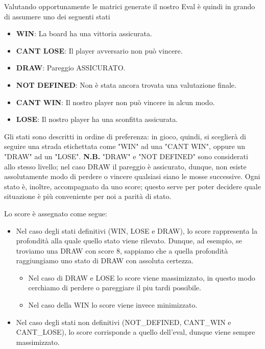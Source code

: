 \documentclass{article}
\begin{document}
Valutando opportunamente le matrici generate il nostro Eval è quindi in grando di assumere uno dei seguenti stati
\begin{itemize}
\item \textbf{WIN}: La board ha una vittoria assicurata.
\item \textbf{CANT LOSE}: Il player avversario non può vincere.
\item \textbf{DRAW}: Pareggio ASSICURATO.
\item \textbf{NOT DEFINED}: Non è stata ancora trovata una valutazione finale.
\item \textbf{CANT WIN}: Il nostro player non può vincere in alcun modo.
\item \textbf{LOSE}: Il nostro player ha una sconfitta assicurata.
\end{itemize}
\medskip
Gli stati sono descritti in ordine di preferenza: in gioco, quindi, si sceglierà di seguire una strada etichettata come "WIN" ad una "CANT WIN", oppure un "DRAW" ad un "LOSE".
\newline
\newline
\textbf{N.B.} "DRAW" e "NOT DEFINED" sono considerati allo stesso livello; nel caso DRAW il pareggio è assicurato, dunque, non esiste assolutamente modo di perdere o vincere qualsiasi siano le mosse successive.
\newline
\newline
Ogni stato è, inoltre, accompagnato da uno score; questo serve per poter decidere quale situazione è più conveniente per noi a parità di stato.

Lo score è assegnato come segue:
\begin{itemize}
    \item Nel caso degli stati definitivi (WIN, LOSE e DRAW), lo score rappresenta la profondità alla quale quello stato viene rilevato. Dunque, ad esempio, se troviamo una DRAW con score 8, sappiamo che a quella profondità raggiungiamo uno stato di DRAW con assoluta certezza.
    \begin{itemize}
        \item Nel caso di DRAW e LOSE lo score viene massimizzato, in questo modo cerchiamo di perdere o pareggiare il piu tardi possibile.
        \item Nel caso della WIN lo score viene invece minimizzato.
    \end{itemize}
    \item Nel caso degli stati non definitivi (NOT\_DEFINED, CANT\_WIN e CANT\_LOSE), lo score corrisponde a quello dell'eval, dunque viene sempre massimizzato.
\end{itemize}
\end{document}
